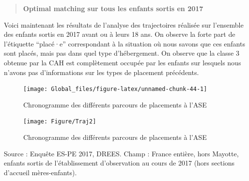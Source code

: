 \documentclass[
  12,
  a4paper,
]{report}
\begin{document}
\begin{quote}
\textbf{Optimal matching sur tous les enfants sortis en 2017}
\end{quote}

Voici maintenant les résultats de l'analyse des trajectoires réalisée
sur l'ensemble des enfants sortis en 2017 avant ou à leurs 18 ans. On
observe la forte part de l'étiquette ``placé·e'' correspondant à la
situation où nous savons que ces enfants sont placés, mais pas dans quel
type d'hébergement. On observe que la classe 3 obtenue par la CAH est
complètement occupée par les enfants sur lesquels nous n'avons pas
d'informations sur les types de placement précédents.

\begin{figure}[H]

{\centering \texttt{[image: Global\_files/figure-latex/unnamed-chunk-44-1]} 

}

\caption{Chronogramme des différents parcours de placements à l'ASE}\label{fig:unnamed-chunk-44}
\end{figure}

\begin{figure}[H]

{\centering \texttt{[image: Figure/Traj2]} 

}

\caption{Chronogramme des différents parcours de placements à l'ASE}\label{fig:unnamed-chunk-48}
\end{figure}
\begin{flushright}
\small{Source : Enquête ES-PE 2017, DREES.
Champ : France entière, hors Mayotte, enfants sortis de l’établissement d’observation au cours de 2017 (hors sections d’accueil mères-enfants).}
\end{flushright}
\end{document}
